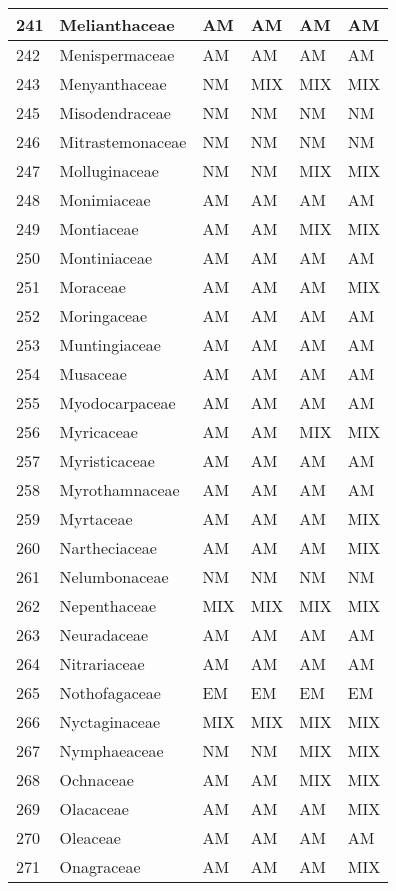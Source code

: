 \documentclass[]{article}
\begin{document}
\begin{longtable}{l|l|l|l|l|l}
\hline
241 & Melianthaceae & AM & AM & AM & AM\\
\hline
242 & Menispermaceae & AM & AM & AM & AM\\
\hline
243 & Menyanthaceae & NM & MIX & MIX & MIX\\
\hline
245 & Misodendraceae & NM & NM & NM & NM\\
\hline
246 & Mitrastemonaceae & NM & NM & NM & NM\\
\hline
247 & Molluginaceae & NM & NM & MIX & MIX\\
\hline
248 & Monimiaceae & AM & AM & AM & AM\\
\hline
249 & Montiaceae & AM & AM & MIX & MIX\\
\hline
250 & Montiniaceae & AM & AM & AM & AM\\
\hline
251 & Moraceae & AM & AM & AM & MIX\\
\hline
252 & Moringaceae & AM & AM & AM & AM\\
\hline
253 & Muntingiaceae & AM & AM & AM & AM\\
\hline
254 & Musaceae & AM & AM & AM & AM\\
\hline
255 & Myodocarpaceae & AM & AM & AM & AM\\
\hline
256 & Myricaceae & AM & AM & MIX & MIX\\
\hline
257 & Myristicaceae & AM & AM & AM & AM\\
\hline
258 & Myrothamnaceae & AM & AM & AM & AM\\
\hline
259 & Myrtaceae & AM & AM & AM & MIX\\
\hline
260 & Nartheciaceae & AM & AM & AM & MIX\\
\hline
261 & Nelumbonaceae & NM & NM & NM & NM\\
\hline
262 & Nepenthaceae & MIX & MIX & MIX & MIX\\
\hline
263 & Neuradaceae & AM & AM & AM & AM\\
\hline
264 & Nitrariaceae & AM & AM & AM & AM\\
\hline
265 & Nothofagaceae & EM & EM & EM & EM\\
\hline
266 & Nyctaginaceae & MIX & MIX & MIX & MIX\\
\hline
267 & Nymphaeaceae & NM & NM & MIX & MIX\\
\hline
268 & Ochnaceae & AM & AM & MIX & MIX\\
\hline
269 & Olacaceae & AM & AM & AM & MIX\\
\hline
270 & Oleaceae & AM & AM & AM & AM\\
\hline
271 & Onagraceae & AM & AM & AM & MIX\\

\end{longtable}
\end{document}

